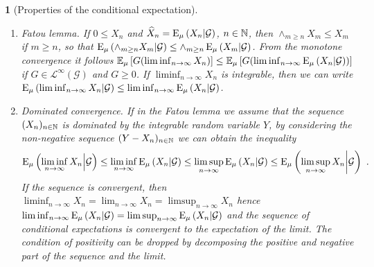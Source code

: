 \documentclass[12pt,a4paper]{amsart}
\theoremstyle{plain}%
\newtheorem{npar}{}%
\theoremstyle{definition}
\theoremstyle{remark}
\begin{document}
\begin{npar}[Properties of the conditional expectation]
\begin{enumerate}
\item \emph{Fatou lemma}. If $0 \le X_n$ and $\widehat X_n = \operatorname{E}_{\mu}\left(X_n \middle| \mathcal G\right)$, $n \in \mathbb{N}$, then $\wedge_{m \ge n} X_m \le X_m$ if $m \ge n$, so that $\operatorname{E}_{\mu}\left(\wedge_{m \ge n} X_m \middle| \mathcal G\right) \le \wedge_{m\ge n} \operatorname{E}_{\mu}\left(X_m \middle| \mathcal G\right)$. From the monotone convergence it follows $\operatorname{\mathbb E}_{\mu}\left[G (\liminf_{n\to\infty} X_n)\right] \le \operatorname{\mathbb E}_{\mu}\left[G(\liminf_{n\to\infty} \operatorname{E}_{\mu}\left(X_n \middle| \mathcal G\right))\right]$ if $G \in \mathcal L^{\infty}(\mathcal G)$ and $G \ge 0$. If $\liminf_{n\to\infty} X_n$ is integrable, then we can write $\operatorname{E}_{\mu}\left(\liminf_{n\to\infty} X_n \middle| \mathcal G\right) \le \liminf_{n\to\infty} \operatorname{E}_{\mu}\left(X_n \middle| \mathcal G\right)$. 
\item \emph{Dominated convergence}. If in the Fatou lemma we assume that the sequence $(X_n)_{n\in\mathbb{N}}$ is dominated by the integrable random variable $Y$, by considering the non-negative sequence $(Y - X_n)_{n\in\mathbb{N}}$ we can obtain the inequality
  \begin{equation*}
    \operatorname{E}_{\mu}\left(\liminf_{n\to\infty} X_n \middle| \mathcal G\right) \le \liminf_{n\to\infty} \operatorname{E}_{\mu}\left(X_n \middle| \mathcal G\right) \le \limsup_{n\to\infty} \operatorname{E}_{\mu}\left(X_n \middle| \mathcal G\right) \le \operatorname{E}_{\mu}\left(\limsup_{n\to\infty} X_n \middle| \mathcal G\right) \ .
  \end{equation*}
  If the sequence is convergent, then $\liminf_{n\to\infty} X_n = \lim_{n\to\infty} X_n = \limsup_{n\to\infty} X_n$ hence $\liminf_{n\to\infty} \operatorname{E}_{\mu}\left(X_n \middle| \mathcal G\right) = \limsup_{n\to\infty} \operatorname{E}_{\mu}\left(X_n \middle| \mathcal G\right)$ and the sequence of conditional expectations is convergent to the expectation of the limit. The condition of positivity can be dropped by decomposing the positive and negative part of the sequence and the limit.
\end{enumerate}
\end{npar}
\end{document}
